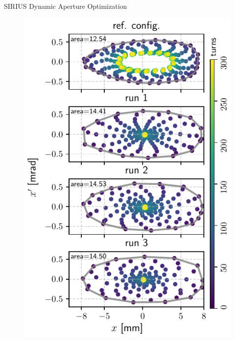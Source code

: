 \documentclass[aspectratio=169]{beamer}
\begin{document}
\begin{frame}{SIRIUS Dynamic Aperture Optimization}
\begin{minipage}{0.44\textwidth}
\begin{figure}
            \includegraphics[height=0.9\textheight]{WEPL087_f2.pdf}
        \end{figure}
    \end{minipage}
\end{frame}
\end{document}
